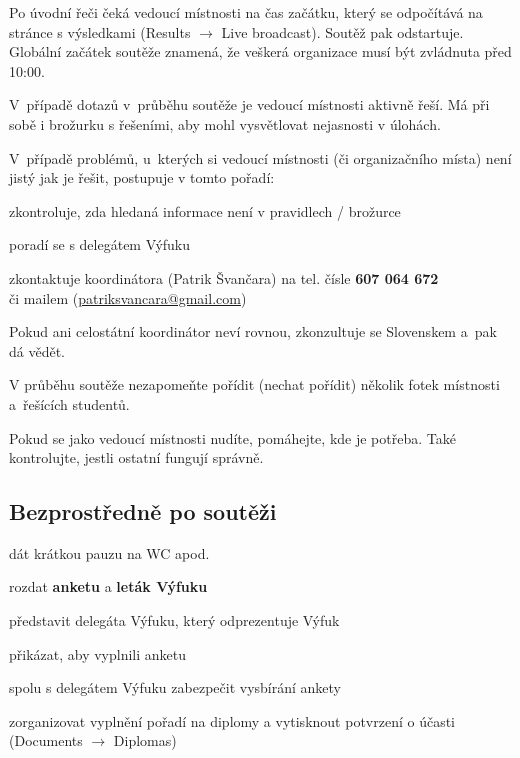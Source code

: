 \documentclass[vyfuk,\classoptions]{fksempty}
\begin{document}
\smallskip 

Po úvodní řeči čeká vedoucí místnosti na čas začátku, který se odpočítává
na stránce s výsledkami (Results $\rightarrow$ Live broadcast). Soutěž pak
odstartuje. Globální začátek soutěže znamená, že veškerá organizace musí být
zvládnuta před 10:00.


\medskip 

V~případě dotazů v~průběhu soutěže je vedoucí místnosti aktivně řeší.
Má při sobě i brožurku s řešeními, aby mohl vysvětlovat nejasnosti v úlohách.

V~případě problémů, u~kterých si vedoucí místnosti (či organizačního místa)
není jistý jak je řešit, postupuje v tomto pořadí:
\begin{compactenum}
\item zkontroluje, zda hledaná informace není v pravidlech / brožurce
\item poradí se s delegátem Výfuku
\item zkontaktuje  koordinátora (Patrik Švančara) na tel. čísle {\bf 607 064 672} \\
či mailem (\url{patriksvancara@gmail.com})
\end{compactenum}

Pokud ani celostátní koordinátor neví rovnou, zkonzultuje se Slovenskem a~pak dá vědět.

\smallskip

V průběhu soutěže nezapomeňte pořídit (nechat pořídit) několik fotek místnosti a~řešících studentů.

Pokud se jako vedoucí místnosti nudíte, pomáhejte, kde je potřeba. 
Také kontrolujte, jestli ostatní fungují správně.

\medskip

\subsection{Bezprostředně po soutěži}

\begin{compactitem}
	\item dát krátkou pauzu na WC apod.
	\item rozdat {\bf anketu} a {\bf leták Výfuku}
	\item představit delegáta Výfuku, který odprezentuje Výfuk
	\item přikázat, aby vyplnili anketu
	\item spolu s delegátem Výfuku zabezpečit vysbírání ankety
	\item zorganizovat vyplnění pořadí na diplomy a vytisknout potvrzení
			o účasti (Documents $\rightarrow$ Diplomas)
\end{compactitem}
\end{document}
